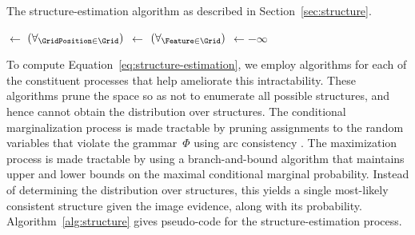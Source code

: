 \begin{algorithm}[t]
  \caption{The structure-estimation algorithm as described in
    Section~\ref{sec:structure}.}
  \GridPositions$\leftarrow$ $(\forall_{\GridPosition\in\Grid})$
  \;
  \Features$\leftarrow$ $(\forall_{\Feature\in\Grid})$
  \Detector{\Feature,\Image}\;
  \BestP$\leftarrow-\infty$\;
  \While{\CSPSolutionsExist{}}{
    \Pro$\leftarrow$\hspace{-5ex}$\displaystyle \prod_{\Bound{\Features}}$\hspace{-5ex}
    \Probability{\Feature}\hspace{-5ex}$\displaystyle
    \prod_{\Bound{\GridPositions}}$ \hspace{-5ex}\Probability{\GridPosition}\;
    \If{$(\forall_{\Features})$\Bound{\Feature}$\wedge$
      $(\forall_{\GridPositions})$\Bound{\GridPosition}}{
      \If{\Pro$>$ \BestP}{\BestP$\leftarrow$ \Pro\;
        \BestS$\leftarrow$ \GridPositions\;
      }
      \Backtrack{}\;
    }
    \lIf{\Pro$<$ \BestP}{\Backtrack{}}\;
    \Bind{\Select{\Unbound{\GridPosition$\cup$ \Feature}}}\;
    \AC{\Constraints}\;
    \lIf{\Inconsistent{}}{\Backtrack{}}
  }
  \label{alg:structure}
\end{algorithm}

To compute Equation~\ref{eq:structure-estimation}, we employ algorithms
for each of the constituent processes that help ameliorate this intractability.
%
These algorithms prune the space so as not to enumerate all possible
structures, and hence cannot obtain the distribution over structures.
%
The conditional marginalization process is made tractable by pruning
assignments to the random variables that violate the grammar~$\Phi$ using arc
consistency \cite{Mackworth1977}.
%
The maximization process is made tractable by using a branch-and-bound
algorithm \cite{Land1960} that maintains upper and lower bounds on the maximal
conditional marginal probability.
%
Instead of determining the distribution over structures, this yields a single
most-likely consistent structure given the image evidence, along with its
probability.
%
Algorithm~\ref{alg:structure} gives pseudo-code for the structure-estimation
process.

